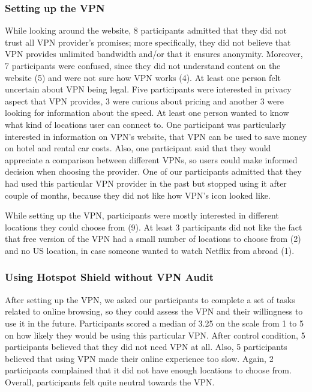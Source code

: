 \subsubsection{Setting up the VPN}

While looking around the website, 8 participants admitted that they did not
trust all VPN provider's promises; more specifically, they did not believe
that VPN provides unlimited bandwidth and/or that it ensures anonymity.
Moreover, 7 participants were confused, since they did not understand content
on the website (5) and were not sure how VPN works (4). At least one person
felt uncertain about VPN being legal. Five participants were interested in
privacy aspect that VPN provides, 3 were curious about pricing and another 3
were looking for information about the speed. At least one person wanted to
know what kind of locations user can connect to. One participant was
particularly interested in information on VPN's website, that VPN can be used
to save money on hotel and rental car costs.  Also, one participant said that
they would appreciate a comparison between different VPNs, so users could make
informed decision when choosing the provider. One of our participants admitted
that they had used this particular VPN provider in the past but stopped using
it after couple of months, because they did not like how VPN's icon looked
like. 

While setting up the VPN, participants were mostly interested in different
locations they could choose from (9). At least 3 participants did not like the
fact that free version of the VPN had a small number of locations to choose
from (2) and no US location, in case someone wanted to watch Netflix from
abroad (1).


\subsubsection{Using Hotspot Shield without VPN Audit}

After setting up the VPN, we asked our participants to complete a set of tasks
related to online browsing, so they could assess the VPN and their willingness
to use it in the future. Participants scored a median of 3.25 on the scale
from 1 to 5 on how likely they would be using this particular VPN. After
control condition, 5 participants believed that they did not need VPN at all.
Also, 5 participants believed that using VPN made their online experience too
slow. Again, 2 participants complained that it did not have enough locations
to choose from. Overall, participants felt quite neutral towards the VPN.


